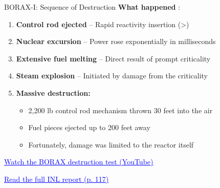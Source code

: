 \documentclass[aspectratio=169]{beamer}
\begin{document}
\begin{frame}[allowframebreaks]{BORAX-I: Sequence of Destruction}
    \textbf{What happened} \cite{putman2012criticality}:

    \vspace{1em}
    \begin{enumerate}
        \item \textbf{Control rod ejected} – Rapid reactivity insertion (>)
        \item \textbf{Nuclear excursion} – Power rose exponentially in milliseconds
        \item \textbf{Extensive fuel melting} – Direct result of prompt criticality
        \item \textbf{Steam explosion} – Initiated by damage from the criticality
        \item \textbf{Massive destruction:}
        \begin{itemize}
            \item 2,200 lb control rod mechanism thrown 30 feet into the air
            \item Fuel pieces ejected up to 200 feet away
            \item Fortunately, damage was limited to the reactor itself
        \end{itemize}
    \end{enumerate}

    \vspace{1em}
    \href{https://youtu.be/8WfNzJVxVz4?si=vcfWk0Pa0f214-q2&t=790}{\textcolor{blue}{\underline{Watch the BORAX destruction test (YouTube)}}}
    
    \href{https://inldigitallibrary.inl.gov/content/uploads/50/2026/04/5427214.pdf}{\textcolor{blue}{\underline{Read the full INL report (p. 117)}}}
\end{frame}
\end{document}
